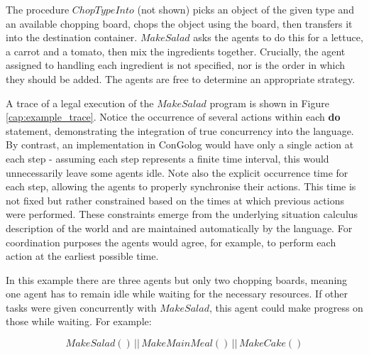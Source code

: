 \documentclass[letterpaper]{article}
\begin{document}
The procedure $ChopTypeInto$ (not shown) picks an object of the given
type and an available chopping board, chops the object using the board,
then transfers it into the destination container. $MakeSalad$ asks
the agents to do this for a lettuce, a carrot and a tomato, then mix
the ingredients together. Crucially, the agent assigned to handling
each ingredient is not specified, nor is the order in which they should
be added. The agents are free to determine an appropriate strategy.

%
\begin{figure*}[t]
\centering
{}
\caption{One possible execution of the $MakeSalad$
program with three agents. Variables $\_ U$, $\_ T$, etc give
the occurrence times of each action, constrained to ensure all situations
are legal.}\label{cap:example_trace}
\end{figure*}


A trace of a legal execution of the $MakeSalad$ program is shown
in Figure \ref{cap:example_trace}. Notice the occurrence of several
actions within each \textbf{do} statement, demonstrating the integration
of true concurrency into the language. By contrast, an implementation
in ConGolog would have only a single action at each step - assuming
each step represents a finite time interval, this would unnecessarily
leave some agents idle. Note also the explicit occurrence time for
each step, allowing the agents to properly synchronise their actions.
This time is not fixed but rather constrained based on the times at
which previous actions were performed. These constraints emerge from
the underlying situation calculus description of the world and are
maintained automatically by the language. For coordination purposes
the agents would agree, for example, to perform each action at the
earliest possible time.

In this example there are three agents but only two chopping boards,
meaning one agent has to remain idle while waiting for the necessary
resources. If other tasks were given concurrently with $MakeSalad$,
this agent could make progress on those while waiting. For example:

\[
MakeSalad()\,||\, MakeMainMeal()\,||\, MakeCake()\]
\end{document}
